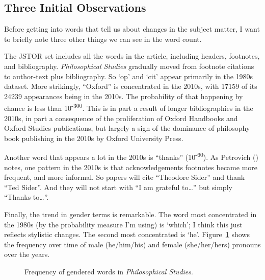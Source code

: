 \documentclass[
  10pt,
  letterpaper,
  DIV=11,
  numbers=noendperiod,
  twoside]{scrartcl}
\begin{document}
\subsection{Three Initial
Observations}\label{three-initial-observations}

Before getting into words that tell us about changes in the subject
matter, I want to briefly note three other things we can see in the word
count.

The JSTOR set includes all the words in the article, including headers,
footnotes, and bibliography. \emph{Philosophical Studies} gradually
moved from footnote citations to author-text plus bibliography. So `op'
and `cit' appear primarily in the 1980s dataset. More strikingly,
``Oxford'' is concentrated in the 2010s, with 17159 of its 24239
appearances being in the 2010s. The probability of that happening by
chance is less than 10\textsuperscript{-300}. This is in part a result
of longer bibliographies in the 2010s, in part a consequence of the
proliferation of Oxford Handbooks and Oxford Studies publications, but
largely a sign of the dominance of philosophy book publishing in the
2010s by Oxford University Press.

Another word that appears a lot in the 2010s is ``thanks''
(10\textsuperscript{-60}). As Petrovich
() notes, one pattern in the 2010s is
that acknowledgements footnotes became more frequent, and more informal.
So papers will cite ``Theodore Sider'' and thank ``Ted Sider''. And they
will not start with ``I am grateful to\ldots{}'' but simply ``Thanks
to\ldots{}''.

Finally, the trend in gender terms is remarkable. The word most
concentrated in the 1980s (by the probability measure I'm using) is
`which'; I think this just reflects stylistic changes. The second most
concentrated is `he'. Figure~\ref{fig-gender-words} shows the frequency
over time of male (he/him/his) and female (she/her/hers) pronouns over
the years.

\begin{figure}


\caption{\label{fig-gender-words}Frequency of gendered words in
\emph{Philosophical Studies}.}

\end{figure}%
\end{document}
